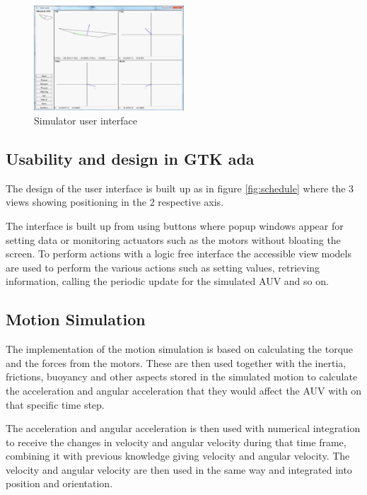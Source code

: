 \begin{figure}[h]
    \includegraphics[width=0.5\textwidth]{./figure/Simulator-mod-500x350.png}
    \caption{Simulator user interface}
    \label{fig:one_column_figure}
\end{figure}
\pagebreak

\subsection{Usability and design in GTK ada}


The design of the user interface is built up as in figure \ref{fig:schedule} where the 3 views showing positioning in the 2 respective axis.

The interface is built up from using buttons where popup windows appear for setting data or monitoring actuators such as the motors without bloating the screen. To perform actions with a logic free interface the accessible view models are used to perform the various actions such as setting values, retrieving information, calling the periodic update for the simulated AUV and so on.

\subsection{Motion Simulation}
The implementation of the motion simulation is based on calculating the torque and the forces from the motors. These are then used together with the inertia, frictions, buoyancy and other aspects stored in the simulated motion to calculate the acceleration and angular acceleration that they would affect the AUV with on that specific time step.
 
The acceleration and angular acceleration is then used with numerical integration to receive the changes in velocity and angular velocity during that time frame, combining it with previous knowledge giving velocity and angular velocity. The velocity and angular velocity are then used in the same way and integrated into position and orientation. 

